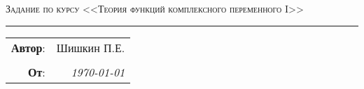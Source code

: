 \documentclass{article}
\begin{document}
\setlength{\abovedisplayskip}{3pt}
\setlength{\abovedisplayshortskip}{3pt}
\setlength{\belowdisplayskip}{3pt}
\setlength{\belowdisplayshortskip}{3pt}


\begin{center}
    \LARGE \textsc{Задание по курсу <<Теория функций комплексного переменного I>>}
\end{center}

\hrule

\phantom{42}

\begin{flushright}
    \begin{tabular}{rr}
        \textbf{Автор}: 
        & Шишкин П.Е. \\ 
        &\\
        \textbf{От}: &
        \textit{\today}\\
    \end{tabular}
\end{flushright}

\thispagestyle{empty}
\tableofcontents 
\newpage
                                           
\end{document}
